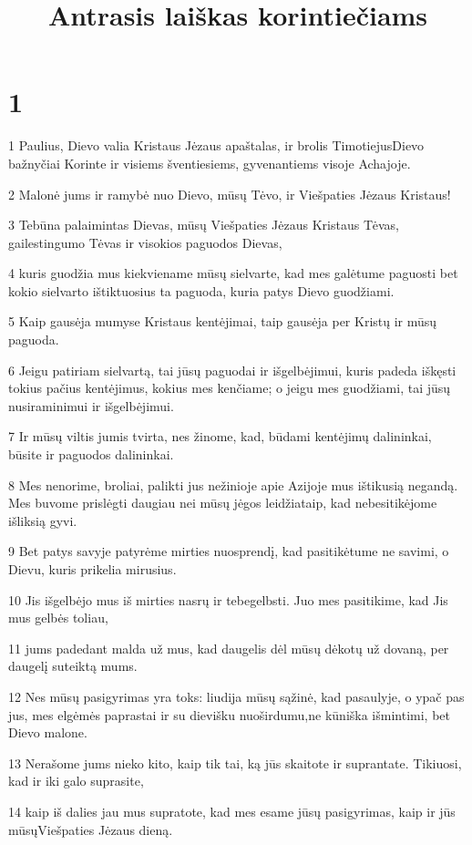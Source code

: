 

\title{Antrasis laiškas korintiečiams}

\chapter{1}


\par 1 Paulius, Dievo valia Kristaus Jėzaus apaštalas, ir brolis Timotiejus­Dievo bažnyčiai Korinte ir visiems šventiesiems, gyvenantiems visoje Achajoje. 
\par 2 Malonė jums ir ramybė nuo Dievo, mūsų Tėvo, ir Viešpaties Jėzaus Kristaus! 
\par 3 Tebūna palaimintas Dievas, mūsų Viešpaties Jėzaus Kristaus Tėvas, gailestingumo Tėvas ir visokios paguodos Dievas, 
\par 4 kuris guodžia mus kiekviename mūsų sielvarte, kad mes galėtume paguosti bet kokio sielvarto ištiktuosius ta paguoda, kuria patys Dievo guodžiami. 
\par 5 Kaip gausėja mumyse Kristaus kentėjimai, taip gausėja per Kristų ir mūsų paguoda. 
\par 6 Jeigu patiriam sielvartą, tai jūsų paguodai ir išgelbėjimui, kuris padeda iškęsti tokius pačius kentėjimus, kokius mes kenčiame; o jeigu mes guodžiami, tai jūsų nusiraminimui ir išgelbėjimui. 
\par 7 Ir mūsų viltis jumis tvirta, nes žinome, kad, būdami kentėjimų dalininkai, būsite ir paguodos dalininkai. 
\par 8 Mes nenorime, broliai, palikti jus nežinioje apie Azijoje mus ištikusią negandą. Mes buvome prislėgti daugiau nei mūsų jėgos leidžia­taip, kad nebesitikėjome išliksią gyvi. 
\par 9 Bet patys savyje patyrėme mirties nuosprendį, kad pasitikėtume ne savimi, o Dievu, kuris prikelia mirusius. 
\par 10 Jis išgelbėjo mus iš mirties nasrų ir tebegelbsti. Juo mes pasitikime, kad Jis mus gelbės toliau, 
\par 11 jums padedant malda už mus, kad daugelis dėl mūsų dėkotų už dovaną, per daugelį suteiktą mums. 
\par 12 Nes mūsų pasigyrimas yra toks: liudija mūsų sąžinė, kad pasaulyje, o ypač pas jus, mes elgėmės paprastai ir su dievišku nuoširdumu,­ne kūniška išmintimi, bet Dievo malone. 
\par 13 Nerašome jums nieko kito, kaip tik tai, ką jūs skaitote ir suprantate. Tikiuosi, kad ir iki galo suprasite, 
\par 14 kaip iš dalies jau mus supratote, kad mes esame jūsų pasigyrimas, kaip ir jūs mūsų­Viešpaties Jėzaus dieną. 
